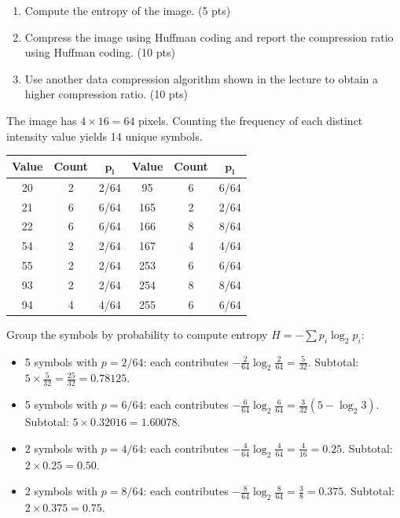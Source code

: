 \documentclass[12pt]{article}
\begin{document}
\vspace{0.3cm}

\begin{enumerate}[label=(\alph*)]
\item Compute the entropy of the image. (5 pts)
\item Compress the image using Huffman coding and report the compression ratio using Huffman coding. (10 pts)
\item Use another data compression algorithm shown in the lecture to obtain a higher compression ratio. (10 pts)
\end{enumerate}


\vspace{0.4cm}

\begin{stepbox}
The image has $4 \times 16 = 64$ pixels. Counting the frequency of each distinct intensity value yields 14 unique symbols.

\vspace{0.3cm}

\begin{center}
\renewcommand{\arraystretch}{1.1}
\begin{tabular}{|c|c|c||c|c|c|}
\hline
\textbf{Value} & \textbf{Count} & $\boldsymbol{p_i}$ & \textbf{Value} & \textbf{Count} & $\boldsymbol{p_i}$ \\
\hline
20  & 2 & 2/64  & 95  & 6 & 6/64 \\
21  & 6 & 6/64  & 165 & 2 & 2/64 \\
22  & 6 & 6/64  & 166 & 8 & 8/64 \\
54  & 2 & 2/64  & 167 & 4 & 4/64 \\
55  & 2 & 2/64  & 253 & 6 & 6/64 \\
93  & 2 & 2/64  & 254 & 8 & 8/64 \\
94  & 4 & 4/64  & 255 & 6 & 6/64 \\
\hline
\end{tabular}
\end{center}

\vspace{0.3cm}

Group the symbols by probability to compute entropy $H = -\sum p_i \log_2 p_i$:

\begin{itemize}
\item 5 symbols with $p=2/64$: each contributes $-\frac{2}{64}\log_2\frac{2}{64} = \frac{5}{32}$. Subtotal: $5 \times \frac{5}{32} = \frac{25}{32} = 0.78125$.
\item 5 symbols with $p=6/64$: each contributes $-\frac{6}{64}\log_2\frac{6}{64} = \frac{3}{32}(5-\log_2 3)$. Subtotal: $5 \times 0.32016 = 1.60078$.
\item 2 symbols with $p=4/64$: each contributes $-\frac{4}{64}\log_2\frac{4}{64} = \frac{4}{16} = 0.25$. Subtotal: $2 \times 0.25 = 0.50$.
\item 2 symbols with $p=8/64$: each contributes $-\frac{8}{64}\log_2\frac{8}{64} = \frac{3}{8} = 0.375$. Subtotal: $2 \times 0.375 = 0.75$.
\end{itemize}
\end{stepbox}
\end{document}
